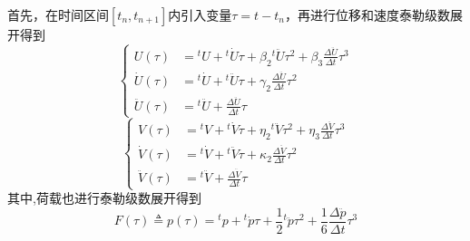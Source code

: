 首先，在时间区间$[t_n,t_{n+1}]$内引入变量$\tau=t-t_n$，再进行位移和速度泰勒级数展开得到
\begin{equation}
\left\{\begin{aligned}
U(\tau)&={^t\!U}+{^t\!\dot{U}}\tau+\beta_2{^t\!\ddot{U}}\tau^2+\beta_3\frac{\Delta\ddot{U}}{\Delta t}\tau^3\\
\dot{U}(\tau)&={^t\!\dot{U}}+{^t\!\ddot{U}}\tau+\gamma_2\frac{\Delta \ddot{U}}{\Delta t}\tau^2\\
\ddot{U}(\tau)&={^t\!\ddot{U}}+\frac{\Delta\ddot{U}}{\Delta t}\tau
\end{aligned}\right.
\end{equation}\vspace{-0.5cm}
\begin{equation}
\left\{\begin{aligned}
V(\tau)&={^t\!V}+{^t\!\dot{V}}\tau+\eta_2{^t\!\ddot{V}}\tau^2+\eta_3\frac{\Delta\ddot{V}}{\Delta t}\tau^3\\
\dot{V}(\tau)&={^t\!\dot{V}}+{^t\!\ddot{V}}\tau+\kappa_2\frac{\Delta \ddot{V}}{\Delta t}\tau^2\\
\ddot{V}(\tau)&={^t\!\ddot{V}}+\frac{\Delta\ddot{V}}{\Delta t}\tau
\end{aligned}\right.
\end{equation}
其中,荷载也进行泰勒级数展开得到
\begin{equation}
F(\tau)\triangleq p(\tau)={^t\!p}+{^t\!\dot{p}}\tau+\frac12{^t\!\ddot{p}}\tau^2+\frac16\frac{\Delta\ddot{p}}{\Delta t}\tau^3
\end{equation}

